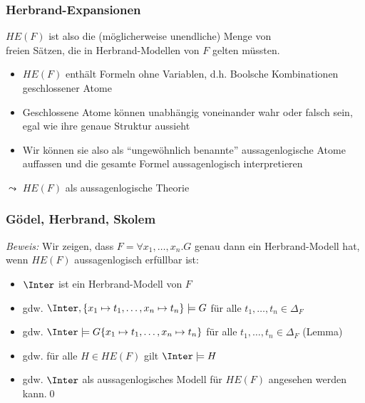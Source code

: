 \documentclass[aspectratio=1610,onlymath]{beamer}
\begin{document}
\begin{frame}\frametitle{Herbrand-Expansionen}


$HE(F)$ ist also die (möglicherweise unendliche) Menge von \\ freien Sätzen, die in Herbrand-Modellen von $F$ gelten müssten.
\pause\bigskip

\begin{itemize}
\item $HE(F)$ enthält Formeln ohne Variablen, d.h. Boolsche Kombinationen geschlossener Atome
\item Geschlossene Atome können unabhängig voneinander wahr oder falsch sein, egal wie ihre genaue Struktur aussieht
\item Wir können sie also als "`ungewöhnlich benannte"' aussagenlogische Atome auffassen und die gesamte Formel aussagenlogisch interpretieren
\end{itemize}
\alert{$\leadsto$ $HE(F)$ als aussagenlogische Theorie}


\end{frame}

\begin{frame}\frametitle{Gödel, Herbrand, Skolem}

\pause

\emph{Beweis:} Wir zeigen, dass $F=\forall x_1,\ldots,x_n.G$ genau dann ein Herbrand-Modell hat, wenn $HE(F)$ aussagenlogisch erfüllbar ist:\pause

\begin{itemize}
\item $\Inter$ ist ein Herbrand-Modell von $F$\pause
\item gdw. $\Inter,\{x_1\mapsto t_1,\ldots,x_n\mapsto t_n\}\models G$ für alle $t_1,\ldots,t_n\in\Delta_F$\pause
\item gdw. $\Inter\models G\{x_1\mapsto t_1,\ldots,x_n\mapsto t_n\}$ für alle $t_1,\ldots,t_n\in\Delta_F$ (Lemma)\pause
\item gdw. für alle $H\in HE(F)$ gilt $\Inter\models H$\pause
\item gdw. $\Inter$ als aussagenlogisches Modell für $HE(F)$ angesehen werden kann.\qed
\end{itemize}

\end{frame}
\end{document}
